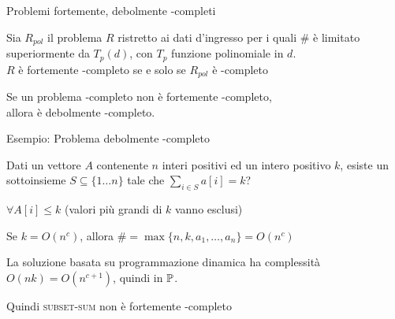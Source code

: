 \begin{frame}{Problemi fortemente, debolmente \NP-completi}

\vspace{-9pt}
\begin{myboxtitle}[Definizione]
Sia $R_{\mathit{pol}}$ il problema $R$ ristretto ai dati d'ingresso per i quali \# è
limitato superiormente da $T_p(d)$, con $T_p$ funzione polinomiale in $d$. \\
$R$ è \alert{fortemente \NP-completo} se e solo se $R_{\mathit{pol}}$ è \NP-completo
\end{myboxtitle}

\begin{myboxtitle}[Definizione]
Se un problema \NP-completo non è fortemente \NP-completo, \\
allora è \alert{debolmente \NP-completo}.    
\end{myboxtitle}

\end{frame}

\begin{frame}{Esempio: Problema debolmente \NP-completo}

\vspace{-9pt}
\begin{myboxtitle}
Dati un vettore $A$ contenente $n$ interi positivi ed un intero positivo $k$, \alert{esiste} un sottoinsieme $S \subseteq \{ 1 \ldots n\}$ tale che 
$\displaystyle \sum_{i \in S} a[i] = k$?
\end{myboxtitle}

\begin{myboxtitle}
\BIL
\item $\forall A[i] \leq k$ (valori più grandi di $k$ vanno esclusi)
\item Se $k=O(n^c)$, allora $\# = \max \{n, k, a_1, \ldots, a_n\} = O(n^c)$
\item La soluzione basata su programmazione dinamica ha complessità
$O(nk) = O(n^{c+1})$, quindi in $\mbox{\sc $\mathbb{P}$}$.
\item Quindi \textsc{subset-sum} non è fortemente \NP-completo
\EIL
\end{myboxtitle}

\end{frame}


